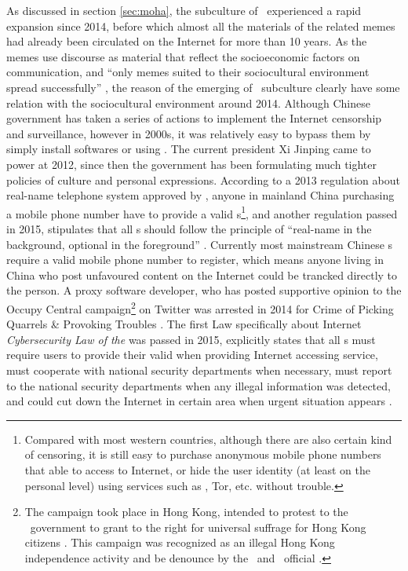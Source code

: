 As discussed in section \ref{sec:moha}, the subculture of \moha\ experienced a rapid expansion since 2014, before which almost all the materials of the related memes had already been circulated on the Internet for more than 10 years. As the memes use discourse as material that reflect the socioeconomic factors on communication, and ``only memes suited to their sociocultural environment spread successfully'' \citep{shifman_telegraphic_2014,johnson_mapping_2007}, the reason of the emerging of \moha\ subculture clearly have some relation with the sociocultural environment around 2014. Although Chinese government has taken a series of actions to implement the Internet censorship and surveillance, however in 2000s, it was relatively easy to bypass them by simply install softwares or using \vpn. The current president Xi Jinping came to power at 2012, since then the government has been formulating much tighter policies of culture and personal expressions. According to a 2013 regulation about real-name telephone system approved by \citet{miit__2013}, anyone in mainland China purchasing a mobile phone number have to provide a valid s\footnote[][-2,5cm]{Compared with most western countries, although there are also certain kind of censoring, it is still easy to purchase anonymous mobile phone numbers that able to access to Internet, or hide the user identity (at least on the personal level) using services such as \vpn, Tor, etc. without trouble.}, and another regulation passed in 2015, stipulates that all \isp s should follow the principle of ``real-name in the background, optional in the foreground'' \citep{miit__2015}. Currently most mainstream Chinese \isp s require a valid mobile phone number to register, which means anyone living in China who post unfavoured content on the Internet could be trancked directly to the person. A proxy software developer, who has posted supportive opinion to the Occupy Central campaign\footnote{The campaign took place in Hong Kong, intended to protest to the \prc\ government to grant to the right for universal suffrage for Hong Kong citizens \citep{branigan_occupy_2014}. This campaign was recognized as an illegal Hong Kong independence activity and be denounce by the \prc\ and \cpc\ official \citep{_--_2014}.} on Twitter was arrested in 2014 for Crime of Picking Quarrels \& Provoking Troubles \citep{__????-17}. The first Law specifically about Internet \textit{Cybersecurity Law of the \prc} was passed in 2015, explicitly states that all \isp s must require users to provide their valid  when providing Internet accessing service, must cooperate with national security departments when necessary, must report to the national security departments when any illegal information was detected, and could cut down the Internet in certain area when urgent situation appears \citep{__waf}.

